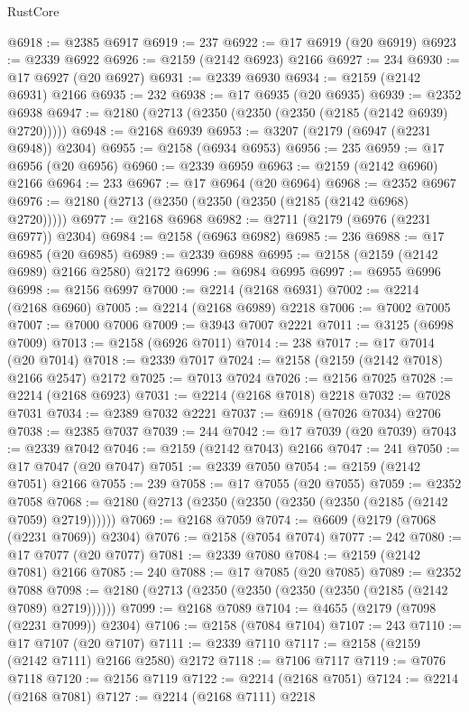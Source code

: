 \begin{lexlean}{RustCore}
\begin{coremodule}
@6918 := @2385 @6917
@6919 := 237
@6922 := @17 @6919 (@20 @6919)
@6923 := @2339 @6922
@6926 := @2159 (@2142 @6923) @2166
@6927 := 234
@6930 := @17 @6927 (@20 @6927)
@6931 := @2339 @6930
@6934 := @2159 (@2142 @6931) @2166
@6935 := 232
@6938 := @17 @6935 (@20 @6935)
@6939 := @2352 @6938
@6947 := @2180 (@2713 (@2350 (@2350 (@2350 (@2185 (@2142 @6939) @2720)))))
@6948 := @2168 @6939
@6953 := @3207 (@2179 (@6947 (@2231 @6948)) @2304)
@6955 := @2158 (@6934 @6953)
@6956 := 235
@6959 := @17 @6956 (@20 @6956)
@6960 := @2339 @6959
@6963 := @2159 (@2142 @6960) @2166
@6964 := 233
@6967 := @17 @6964 (@20 @6964)
@6968 := @2352 @6967
@6976 := @2180 (@2713 (@2350 (@2350 (@2350 (@2185 (@2142 @6968) @2720)))))
@6977 := @2168 @6968
@6982 := @2711 (@2179 (@6976 (@2231 @6977)) @2304)
@6984 := @2158 (@6963 @6982)
@6985 := 236
@6988 := @17 @6985 (@20 @6985)
@6989 := @2339 @6988
@6995 := @2158 (@2159 (@2142 @6989) @2166 @2580) @2172
@6996 := @6984 @6995
@6997 := @6955 @6996
@6998 := @2156 @6997
@7000 := @2214 (@2168 @6931)
@7002 := @2214 (@2168 @6960)
@7005 := @2214 (@2168 @6989) @2218
@7006 := @7002 @7005
@7007 := @7000 @7006
@7009 := @3943 @7007 @2221
@7011 := @3125 (@6998 @7009)
@7013 := @2158 (@6926 @7011)
@7014 := 238
@7017 := @17 @7014 (@20 @7014)
@7018 := @2339 @7017
@7024 := @2158 (@2159 (@2142 @7018) @2166 @2547) @2172
@7025 := @7013 @7024
@7026 := @2156 @7025
@7028 := @2214 (@2168 @6923)
@7031 := @2214 (@2168 @7018) @2218
@7032 := @7028 @7031
@7034 := @2389 @7032 @2221
@7037 := @6918 (@7026 @7034) @2706
@7038 := @2385 @7037
@7039 := 244
@7042 := @17 @7039 (@20 @7039)
@7043 := @2339 @7042
@7046 := @2159 (@2142 @7043) @2166
@7047 := 241
@7050 := @17 @7047 (@20 @7047)
@7051 := @2339 @7050
@7054 := @2159 (@2142 @7051) @2166
@7055 := 239
@7058 := @17 @7055 (@20 @7055)
@7059 := @2352 @7058
@7068 := @2180 (@2713 (@2350 (@2350 (@2350 (@2350 (@2185 (@2142 @7059) @2719))))))
@7069 := @2168 @7059
@7074 := @6609 (@2179 (@7068 (@2231 @7069)) @2304)
@7076 := @2158 (@7054 @7074)
@7077 := 242
@7080 := @17 @7077 (@20 @7077)
@7081 := @2339 @7080
@7084 := @2159 (@2142 @7081) @2166
@7085 := 240
@7088 := @17 @7085 (@20 @7085)
@7089 := @2352 @7088
@7098 := @2180 (@2713 (@2350 (@2350 (@2350 (@2350 (@2185 (@2142 @7089) @2719))))))
@7099 := @2168 @7089
@7104 := @4655 (@2179 (@7098 (@2231 @7099)) @2304)
@7106 := @2158 (@7084 @7104)
@7107 := 243
@7110 := @17 @7107 (@20 @7107)
@7111 := @2339 @7110
@7117 := @2158 (@2159 (@2142 @7111) @2166 @2580) @2172
@7118 := @7106 @7117
@7119 := @7076 @7118
@7120 := @2156 @7119
@7122 := @2214 (@2168 @7051)
@7124 := @2214 (@2168 @7081)
@7127 := @2214 (@2168 @7111) @2218

\end{coremodule}
\end{lexlean}
